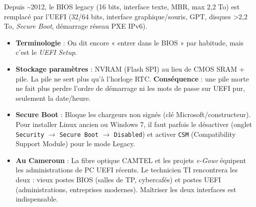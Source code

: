 \documentclass[11pt]{article}
\newcommand{\cle}[1]{{\popxbold\color{popdark}#1}}
\begin{document}
\begin{savaistu}
Depuis \textasciitilde 2012, le BIOS legacy (16 bits, interface texte, MBR, max 2,2 To) est remplacé par l'\cle{UEFI} (32/64 bits, interface graphique/souris, GPT, disques \textgreater 2,2 To, \emph{Secure Boot}, démarrage réseau PXE IPv6).
\begin{itemize}
  \item \textbf{Terminologie} : On dit encore « entrer dans le BIOS » par habitude, mais c'est le \emph{UEFI Setup}.
  \item \textbf{Stockage paramètres} : NVRAM (Flash SPI) au lieu de CMOS SRAM + pile. La pile ne sert plus qu'à l'horloge RTC. \textbf{Conséquence} : une pile morte ne fait plus perdre l'ordre de démarrage ni les mots de passe sur UEFI pur, seulement la date/heure.
  \item \textbf{Secure Boot} : Bloque les chargeurs non signés (clé Microsoft/constructeur). Pour installer Linux ancien ou Windows 7, il faut parfois le désactiver (onglet \texttt{Security} $\to$ \texttt{Secure Boot} $\to$ \texttt{Disabled}) et activer \texttt{CSM} (Compatibility Support Module) pour le mode Legacy.
  \item \textbf{Au Cameroun} : La fibre optique CAMTEL et les projets \emph{e-Gouv} équipent les administrations de PC UEFI récents. Le technicien TI rencontrera les deux : vieux postes BIOS (salles de TP, cybercafés) et postes UEFI (administrations, entreprises modernes). Maîtriser les deux interfaces est indispensable.
\end{itemize}
\end{savaistu}
\end{document}

